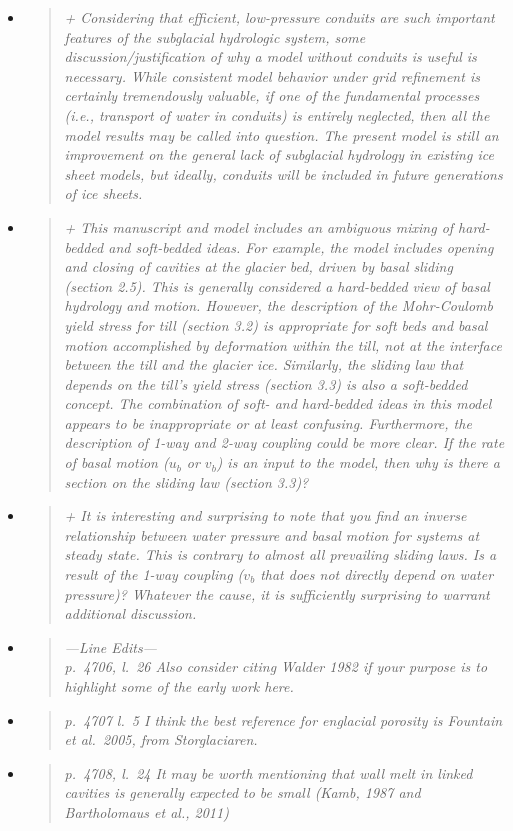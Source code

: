 \documentclass[11pt,reqno]{amsart}
\newcommand{\reply}[2]{
\medskip\medskip
\item  \begin{quote}
\emph{#1}
\end{quote}

\medskip
\noindent #2}
\begin{document}
\begin{itemize}
\reply{+ Considering that efficient, low-pressure conduits are such important features of the
subglacial hydrologic system, some discussion/justification of why a model without conduits is useful is necessary.  While consistent model behavior under grid refinement is
certainly tremendously valuable, if one of the fundamental processes (i.e., transport of
water in conduits) is entirely neglected, then all the model results may be called into
question.  The present model is still an improvement on the general lack of subglacial
hydrology in existing ice sheet models, but ideally, conduits will be included in future
generations of ice sheets.}
{}

\reply{+ This manuscript and model includes an ambiguous mixing of hard-bedded and soft-bedded ideas. For example, the model includes opening and closing of cavities at
the glacier bed, driven by basal sliding (section 2.5).  This is generally considered
a hard-bedded view of basal hydrology and motion.  However, the description of the
Mohr-Coulomb yield stress for till (section 3.2) is appropriate for soft beds and basal
motion accomplished by deformation \emph{within} the till, not at the interface between the
till and the glacier ice. Similarly, the sliding law that depends on the till's yield stress
(section 3.3) is also a soft-bedded concept. The combination of soft- and hard-bedded
ideas in this model appears to be inappropriate or at least confusing. Furthermore,
the description of 1-way and 2-way coupling could be more clear. If the rate of basal
motion ($u_b$ or $v_b$) is an input to the model, then why is there a section on the sliding
law (section 3.3)?}
{}

\reply{+ It is interesting and surprising to note that you find an inverse relationship between
water pressure and basal motion for systems at steady state. This is contrary to almost
all prevailing sliding laws. Is a result of the 1-way coupling ($v_b$ that does not directly
depend on water pressure)? Whatever the cause, it is sufficiently surprising to warrant
additional discussion.}
{}

\reply{---Line Edits---\\
p.~4706, l.~26 Also consider citing Walder 1982 if your purpose is to highlight some of
the early work here.}
{}

\reply{p.~4707 l.~5 I think the best reference for englacial porosity is Fountain et al.~2005, from
Storglaciaren.}
{}

\reply{p.~4708, l.~24 It may be worth mentioning that wall melt in linked cavities is generally
expected to be small (Kamb, 1987 and Bartholomaus et al., 2011)}
{}


\end{itemize}
\end{document}
